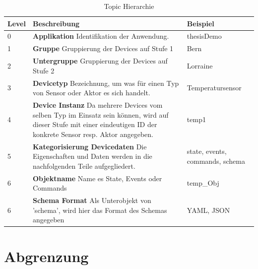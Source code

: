 \begin{table}[H]
\begin{tabularx}{\textwidth}{|l|X|l|}

 \hline \rowcolor{lightgray}
 {\bf Level } & {\bf Beschreibung } & {\bf Beispiel } \\ 
 \hline
 0  &   \textbf{Applikation} \newline Identifikation der Anwendung.  &    
  thesisDemo   \\ \hline
 
 1  &   \textbf{Gruppe}  \newline Gruppierung der Devices auf Stufe 1 &   Bern  \\ \hline

 2  &   \textbf{Untergruppe} \newline Gruppierung der Devices auf Stufe 2   &   Lorraine  \\ \hline

 3  &   \textbf{Devicetyp} \newline Bezeichnung, um was für einen Typ von Sensor oder Aktor es sich handelt.  &   Temperatursensor   \\ \hline

 4  &   \textbf{Device Instanz} \newline Da mehrere Devices vom selben Typ im Einsatz sein können, wird auf dieser Stufe mit einer eindeutigen ID der konkrete Sensor resp. Aktor angegeben.   &    temp1   \\ \hline
 
 5  &   \textbf{Kategorisierung Devicedaten} \newline  Die Eigenschaften und Daten werden in die nachfolgenden Teile aufgegliedert.  &     state, events, commands, schema   \\ \hline
 
 6  &   \textbf{Objektname} \newline Name es State, Events oder Commands    &     temp\_Obj   \\ \hline

 6  &   \textbf{Schema Format} \newline Als Unterobjekt von 'schema', wird hier das Format des Schemas angegeben   &     YAML, JSON   \\ \hline
 

\end{tabularx}
\caption{Topic Hierarchie}
\end{table}


\section{Abgrenzung}

